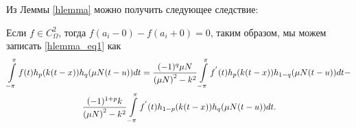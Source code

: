 Из Леммы \ref{hlemma} можно получить следующее следствие:
\begin{corollary} \label{cor_hlemma}
	Если $f \in C_\Omega^2$, тогда $f(a_i - 0) - f(a_i + 0) = 0$, таким образом, мы можем записать \eqref{hlemma_eq1} как
	\begin{multline*}
	\intop_{-\pi}^{\pi}f(t)h_{p}(k(t-x))h_{q}(\mu N(t-u))dt=
	\frac{(-1)^{q}\mu N}{\left(\mu N\right)^{2}-k^{2}}\intop_{-\pi}^{\pi}f^{'}(t)h_{p}(k(t-x))h_{1-q}(\mu N(t-u))dt-\\
	\frac{(-1)^{1+p}k}{\left(\mu N\right)^{2}-k^{2}}\intop_{-\pi}^{\pi}f^{'}(t)h_{1-p}(k(t-x))h_{q}(\mu N(t-u))dt.
	\end{multline*}
\end{corollary}


